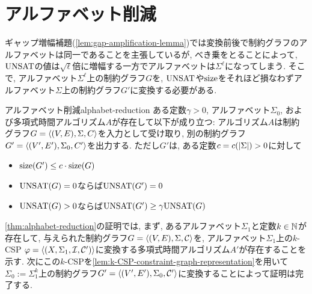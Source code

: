 \section{アルファベット削減}
ギャップ増幅補題(\cref{lem:gap-amplification-lemma})では変換前後で制約グラフのアルファベットは同一であることを主張しているが,
べき乗をとることによって, $\mathrm{UNSAT}$の値は$\sqrt{\ell}$倍に増幅する一方でアルファベットは$\Sigma^\ell$になってしまう.
そこで, アルファベット$\Sigma^\ell$上の制約グラフ$G$を, $\mathrm{UNSAT}$や$\mathrm{size}$をそれほど損なわずアルファベット$\Sigma$上の制約グラフ$G'$に変換する必要がある.
\begin{theorem}{アルファベット削減}{alphabet-reduction}
  ある定数$\gamma>0$, アルファベット$\Sigma_0$, および多項式時間アルゴリズム$A$が存在して以下が成り立つ:
  アルゴリズム$A$は制約グラフ$G=\langle(V,E),\Sigma,C\rangle$を入力として受け取り,
  別の制約グラフ$G'=\langle(V',E'),\Sigma_0,C'\rangle$を出力する.
  ただし$G'$は, ある定数$c=c(\abs{\Sigma})>0$に対して
  \begin{itemize}
    \item $\mathrm{size}(G') \le c\cdot \mathrm{size}(G)$
    \item $\mathrm{UNSAT}(G)=0$ならば$\mathrm{UNSAT}(G')=0$
    \item $\mathrm{UNSAT}(G)>0$ならば$\mathrm{UNSAT}(G') \ge \gamma\mathrm{UNSAT}(G)$
  \end{itemize}
\end{theorem}
\cref{thm:alphabet-reduction}の証明では,
  まず, あるアルファベット$\Sigma_1$と定数$k\in\mathbb{N}$が存在して,
  与えられた制約グラフ$G=\langle(V,E),\Sigma,\mathcal{C}\rangle$を, アルファベット$\Sigma_1$上の$k$-CSP $\varphi=\langle(X,\Sigma_1,\mathcal{I},\mathcal{C}')\rangle$に変換する多項式時間アルゴリズム$A'$が存在することを示す.
  次にこの$k$-CSPを\cref{lem:k-CSP-constraint-graph-representation}を用いて$\Sigma_0:=\Sigma_1^k$上の制約グラフ$G'=\langle(V',E'),\Sigma_0,\mathcal{C}'\rangle$に変換することによって証明は完了する.

